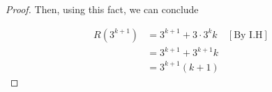 \documentclass[12pt]{article}
\begin{document}
\begin{enumerate}[a.]
\begin{proof}
        \bigskip

        Then, using this fact, we can conclude

        \begin{align}
            R(3^{k+1}) &= 3^{k+1} + 3 \cdot 3^kk & [\text{By I.H}]\\
            &= 3^{k+1} + 3^{k+1}k\\
            &= 3^{k+1}(k + 1)
        \end{align}
    \end{proof}


















\end{enumerate}
\end{document}

